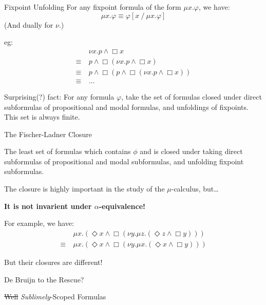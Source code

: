 \documentclass[aspectratio=43]{beamer}
\begin{document}
\begin{frame}{Fixpoint Unfolding}
  For any fixpoint formula of the form $\mu{}x.\varphi{}$, we have:
  \begin{equation*}
    \mu{}x.\varphi \equiv \varphi[x~/~\mu{}x.\varphi{}]
  \end{equation*}
  (And dually for $\nu$.)

  \bigskip

  eg:
  \begin{align*}
    &\nu{}x.p \land \Box{}x \\
    \equiv~&p \land \Box{}(\nu{}x.p \land \Box{}x) \\
    \equiv~&p \land \Box{}(p \land \Box{}(\nu{}x.p \land \Box{}x)) \\
    \equiv~&\ldots{}
  \end{align*}

  \bigskip

  Surprising(?) fact: For any formula $\varphi$, take the set of formulas closed under direct subformulas of propositional and modal formulas, and unfoldings of fixpoints. This set is always finite.
\end{frame}

\begin{frame}{The Fischer-Ladner Closure}
  \begin{definition}
    The least set of formulas which contains $\phi$ and is closed under taking direct subformulas of propositional and modal subformulas, and unfolding fixpoint subformulas.
  \end{definition}
  \bigskip

  The closure is highly important in the study of the $\mu$-calculus, but\ldots{}

  \begin{center}
  \textbf{It is not invarient under $\alpha$-equivalence!}
  \end{center}

  \bigskip

  For example, we have:
  \begin{align*}
  &\mu{}x.(\Diamond{}x \land \Box{}(\nu{}y.\mu{}z.(\Diamond{}z \land \Box{}y)))\\
  \equiv~&\mu{}x.(\Diamond{}x \land \Box{}(\nu{}y.\mu{}x.(\Diamond{}x \land \Box{}y)))
  \end{align*}

  But their closures are different!

\end{frame}

\begin{frame}{De Bruijn to the Rescue?}
  \snippetwellscoped{}
  \snippetscope{}
\end{frame}

\begin{frame}{\sout{Well} \emph{Sublimely}-Scoped Formulas}
  \snippetsublimelyscoped{}
\end{frame}
\end{document}
